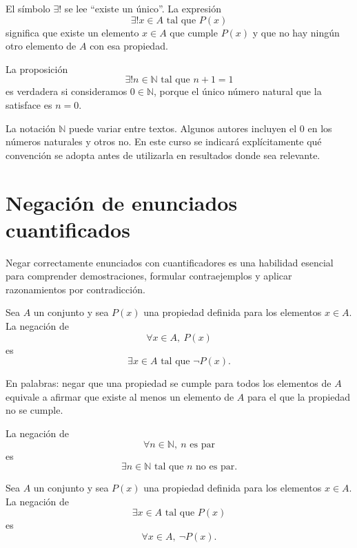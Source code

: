\begin{definicion}
El símbolo $\exists!$ se lee ``existe un único''. La expresión
\[
  \exists! x\in A \text{ tal que } P(x)
\]
significa que existe un elemento $x\in A$ que cumple $P(x)$ y que no hay ningún otro elemento de $A$ con esa propiedad.
\end{definicion}

\begin{ejemplo}
La proposición
\[
  \exists! n\in\mathbb{N} \text{ tal que } n+1=1
\]
es verdadera si consideramos $0\in\mathbb{N}$, porque el único número natural que la satisface es $n=0$.
\end{ejemplo}

\begin{advertencia}
La notación $\mathbb{N}$ puede variar entre textos. Algunos autores incluyen el $0$ en los números naturales y otros no. En este curso se indicará explícitamente qué convención se adopta antes de utilizarla en resultados donde sea relevante.
\end{advertencia}

\section{Negación de enunciados cuantificados}
\label{sec:negacion-cuantificados}

Negar correctamente enunciados con cuantificadores es una habilidad esencial para comprender demostraciones, formular contraejemplos y aplicar razonamientos por contradicción.

\begin{proposicion}
Sea $A$ un conjunto y sea $P(x)$ una propiedad definida para los elementos $x\in A$. La negación de
\[
  \forall x\in A,\ P(x)
\]
es
\[
  \exists x\in A \text{ tal que } \neg P(x).
\]
\end{proposicion}

En palabras: negar que una propiedad se cumple para todos los elementos de $A$ equivale a afirmar que existe al menos un elemento de $A$ para el que la propiedad no se cumple.

\begin{ejemplo}
La negación de
\[
  \forall n\in\mathbb{N},\ n \text{ es par}
\]
es
\[
  \exists n\in\mathbb{N} \text{ tal que } n \text{ no es par}.
\]
\end{ejemplo}

\begin{proposicion}
Sea $A$ un conjunto y sea $P(x)$ una propiedad definida para los elementos $x\in A$. La negación de
\[
  \exists x\in A \text{ tal que } P(x)
\]
es
\[
  \forall x\in A,\ \neg P(x).
\]
\end{proposicion}

